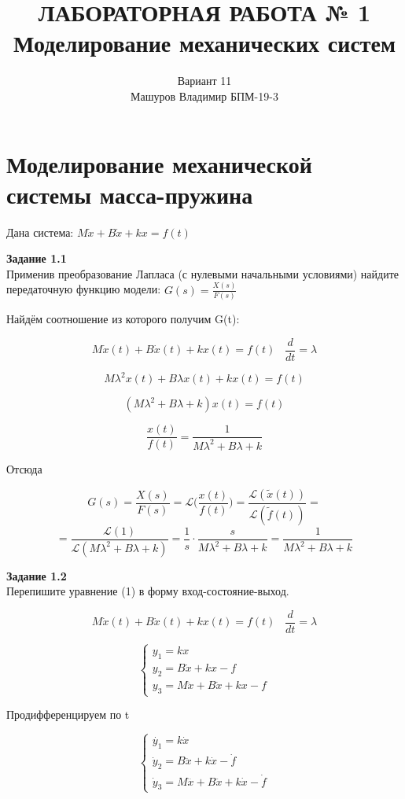 \documentclass[a4paper, 12pt]{article}
\title{ЛАБОРАТОРНАЯ РАБОТА № 1 \\
Моделирование механических систем
}
\author{Вариант 11 \\ Машуров Владимир БПМ-19-3}
\begin{document}
\maketitle
\thispagestyle{empty}
\newpage
\tableofcontents

\section{Моделирование механической системы масса-пружина}

Дана система: $M\dot{x} + B\dot{x} + kx = f(t)$ 

\textbf{Задание 1.1 } \\
Применив преобразование Лапласа (с нулевыми начальными условиями) найдите передаточную функцию модели: $ G(s) = \frac{X(s)}{F(s)} $

Найдём соотношение из которого получим G(t):


$$M\dot{x}(t) + B\dot{x}(t) + kx(t) = f(t) \; \; \; \frac{d}{dt} = \lambda $$

$$ M\lambda^2x(t) + B\lambda x(t) + kx(t) = f(t) $$

$$ (M\lambda^2 + B\lambda + k)x(t) = f(t) $$

$$ \frac{x(t)}{f(t)} = \frac{1}{M\lambda^2 + B\lambda + k} $$

Отсюда

$$ G(s) = \frac{X(s)}{F(s)} = \mathcal{L} \bigg( \frac{x(t)}{f(t)} \bigg) = \frac{\mathcal{L}(\tilde{x}(t))}{\mathcal{L}(\tilde{f}(t))} = $$
$$ = \frac{\mathcal{L}(1)}{\mathcal{L}(M\lambda^2 + B\lambda + k)} =  \frac{1}{s} \cdot \frac{s}{M\lambda^2 + B\lambda + k} = \frac{1}{M\lambda^2 + B\lambda + k} $$

\textbf{Задание 1.2 } \\
Перепишите уравнение (1) в форму вход-состояние-выход.

$$M\dot{x}(t) + B\dot{x}(t) + kx(t) = f(t) \; \; \; \frac{d}{dt} = \lambda $$

$$ \begin{cases}
y_1 = kx \\
y_2 = B\dot{x} + kx - f \\
y_3 = M \ddot{x} + B \dot{x} + kx - f
\end{cases} $$

Продифференцируем по t

$$ \begin{cases}
\dot{y_1} = k\dot{x} \\
\dot y_2 = B\ddot{x} + k \dot x - \dot f \\
\dot y_3 = M \dddot{x} + B \ddot{x} + k \dot x - \dot f
\end{cases} $$
\end{document}
